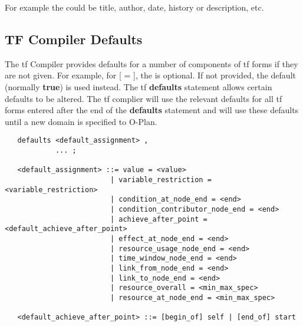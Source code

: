 For example the  could be title, author, date, history or
description, etc.

\subsection{TF Compiler Defaults}

The {\sc tf} Compiler provides defaults for a number of components of
{\sc tf} forms if they are not given.  For example, for 
[ =  ], the  is optional.  If not provided, the
default (normally {\bf true}) is used instead.  The {\sc tf} {\bf
defaults} statement allows certain defaults to be altered.  The {\sc tf}
complier will use the relevant defaults for all {\sc tf} forms entered
after the end of the {\bf defaults} statement and will use these
defaults until a new domain is specified to O-Plan. 

\begin{verbatim}
   defaults <default_assignment> ,
            ... ;

   <default_assignment> ::= value = <value>
                         | variable_restriction = <variable_restriction>
                         | condition_at_node_end = <end>
                         | condition_contributor_node_end = <end>
                         | achieve_after_point = <default_achieve_after_point>
                         | effect_at_node_end = <end>
                         | resource_usage_node_end = <end>
                         | time_window_node_end = <end>
                         | link_from_node_end = <end>
                         | link_to_node_end = <end>
                         | resource_overall = <min_max_spec>
                         | resource_at_node_end = <min_max_spec>

   <default_achieve_after_point> ::= [begin_of] self | [end_of] start
\end{verbatim}

